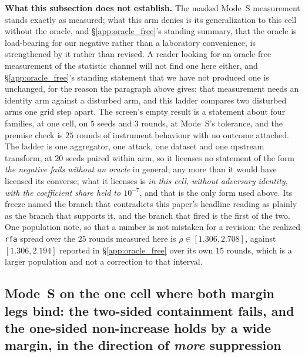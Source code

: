 \documentclass{article}
\begin{document}
\textbf{What this subsection does not establish.} The masked Mode~S measurement stands exactly as measured; what this arm denies is its generalization to this cell without the oracle, and §\ref{app:oracle_free}'s standing summary, that the oracle is load-bearing for our negative rather than a laboratory convenience, is strengthened by it rather than revised. A reader looking for an oracle-free measurement of the statistic channel will not find one here either, and §\ref{app:oracle_free}'s standing statement that we have not produced one is unchanged, for the reason the paragraph above gives: that measurement needs an identity arm against a disturbed arm, and this ladder compares two disturbed arms one grid step apart. The screen's empty result is a statement about four families, at one cell, on $5$ seeds and $3$ rounds, at Mode~S's tolerance, and the premise check is $25$ rounds of instrument behaviour with no outcome attached. The ladder is one aggregator, one attack, one dataset and one upstream transform, at $20$ seeds paired within arm, so it licenses no statement of the form \emph{the negative fails without an oracle} in general, any more than it would have licensed its converse; what it licenses is \emph{in this cell, without adversary identity, with the coefficient share held to $10^{-7}$}, and that is the only form used above. Its freeze named the branch that contradicts this paper's headline reading as plainly as the branch that supports it, and the branch that fired is the first of the two. One population note, so that a number is not mistaken for a revision: the realized \texttt{rfa} spread over the $25$ rounds measured here is $\rho\in[1.306, 2.708]$, against $[1.306, 2.194]$ reported in §\ref{app:oracle_free} over its own $15$ rounds, which is a larger population and not a correction to that interval.

\subsection{Mode~S on the one cell where both margin legs bind: the two-sided containment fails, and the one-sided non-increase holds by a wide margin, in the direction of \emph{more} suppression}
\label{app:pixel_headroom}
\end{document}
